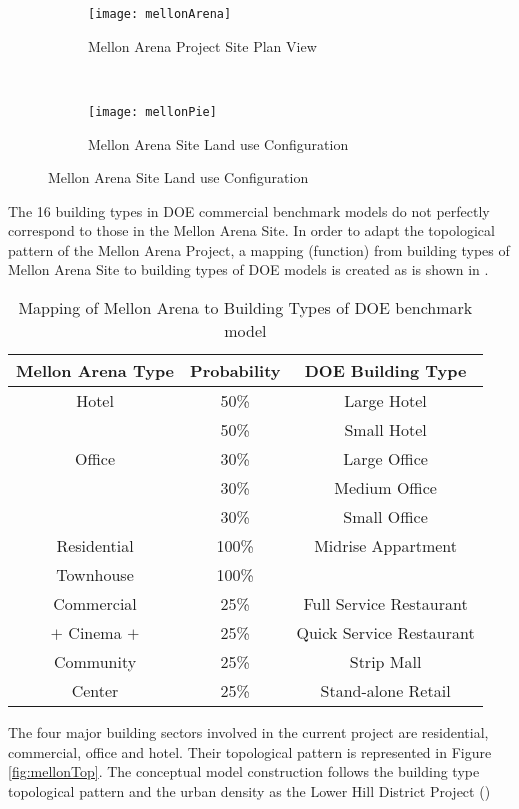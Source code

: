 \begin{figure}[h!]
  \centering
  \begin{subfigure}{0.5\textwidth}
  \centering
  \texttt{[image: mellonArena]}
  \caption[Mellon Arena Site Plan]{Mellon Arena Project Site Plan View}
  \label{fig:mellonArena}
\end{subfigure}
~
\begin{subfigure}{0.3\textwidth}
  \centering
  \texttt{[image: mellonPie]}
  \caption[Mellon Arena Site Land Use]{Mellon Arena Site Land use Configuration}
  \label{fig:mellonPie}
\end{subfigure}
\end{figure}
The 16 building types in DOE commercial benchmark models do not
perfectly correspond to those in the Mellon Arena Site. In order to
adapt the topological pattern of the Mellon Arena Project, a mapping
(function) from building types of Mellon Arena Site to building types
of DOE models is created as is shown in .
\begin{table}[h!]
  \centering
  \begin{tabular}{c| c| c}
    \hline
    Mellon Arena Type &Probability &DOE Building Type\\
    \hline
    \hline
    Hotel &50\%&Large Hotel\\
    \cline{2-3}
    &50\%&Small Hotel\\
    \hline
    Office &30\%&Large Office\\
    \cline{2-3}
    &30\%&Medium Office\\
    \cline{2-3}
    &30\%&Small Office\\
    \hline
    Residential &100\%&Midrise Appartment\\
    \cline{1-2}
    Townhouse &100\%&\\
    \hline
    Commercial &25\%&Full Service Restaurant\\
    \cline{2-3}
    $+$ Cinema $+$&25\%&Quick Service Restaurant\\
    \cline{2-3}
    Community &25\%&Strip Mall\\
    \cline{2-3}
    Center &25\%&Stand-alone Retail\\
    \hline
  \end{tabular}
  \caption{Mapping of Mellon Arena to Building Types of DOE benchmark model}
  \label{tab:typeMap}
\end{table}

The four major building sectors involved in the current project are
residential, commercial, office and hotel. Their topological pattern
is represented in Figure \ref{fig:mellonTop}. The conceptual model
construction follows the building type topological pattern and the
urban density as the Lower Hill District Project ()

